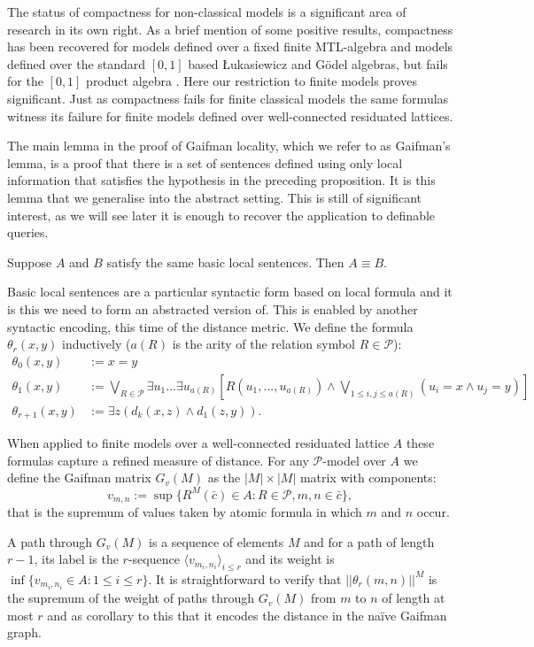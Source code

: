 \documentclass{lmcs} %
\newcommand{\?}{\ensuremath{\mkern0.4\thinmuskip}}
\let\biglor=\bigvee%
\newcommand{\CP}{\mathcal{P}}
\begin{document}
The status of compactness for non-classical models is a significant area of research in its own right. As a brief mention of some positive results, compactness has been recovered for models defined over a fixed finite MTL-algebra \cite[Theorem 4.4]{Dellunde13:FuzzyUltra} and models defined over the standard $[0,1]$ based \L ukasiewicz and G\"{o}del algebras, but fails for the $[0,1]$ product algebra \cite{Hajek02:Technical}. Here our restriction to finite models proves significant. Just as compactness fails for finite classical models \cite[Chapter 0]{EbbinghausFlum95:Finmodeltheory} the same formulas witness its failure for finite models defined over well-connected residuated lattices. 

The main lemma in the proof of Gaifman locality, which we refer to as Gaifman's lemma, is a proof that there is a set of sentences defined using only local information that satisfies the hypothesis in the preceding proposition. It is this lemma that we generalise into the abstract setting. This is still of significant interest, as we will see later it is enough to recover the application to definable queries. 
\begin{thm}
    Suppose $A$ and $B$ satisfy the same basic local sentences. Then $A\equiv B$.
\end{thm}
\noindent
Basic local sentences are a particular syntactic form based on local formula and it is this we need to form an abstracted version of. This is enabled by another syntactic encoding, this time of the distance metric. We define the formula $\theta_r(x,y)$ inductively ($a(R)$ is the arity of the relation symbol $R\in\CP$):
\begin{align*}
    \theta_0(x,y)&:=x=y \\
    \theta_1(x,y)&:=\biglor\limits_{R\in\CP}\exists u_1...\exists u_{a(R)}[R(u_1,...,u_{a(R)})\land\biglor\limits_{1\leq i,j\leq a(R)}(u_i=x\land u_j=y)] \\
    \theta_{r+1}(x,y)&:=\exists z(d_k(x,z)\land d_1(z,y)).
\end{align*}

When applied to finite models over a well-connected residuated lattice $A$ these formulas capture a refined measure of distance. For any $\CP$-model over $A$ we define the Gaifman matrix $G_v(M)$ as the $|M|\times |M|$ matrix with components: \[v_{m,n}:=\sup\{R^M(\bar{c})\in A:R\in \CP, m,n\in\bar{c}\},\] that is the supremum of values taken by atomic formula in which $m$ and $n$ occur.

A path through $G_v(M)$ is a sequence of elements $M$ and for a path of length $r-1$, its label is the $r$-sequence $\langle v_{m_i,n_i}\rangle_{i\leq r}$ and its weight is $\inf\{v_{m_i,n_i}\in A:1\leq i\leq r\}$. It is straightforward to verify that $||\theta_r(m,n)||^M$ is the supremum of the weight of paths through $G_v(M)$ from $m$ to $n$ of length at most $r$ and as corollary to this that it encodes the distance in the na\"{i}ve Gaifman graph. 
\end{document}
